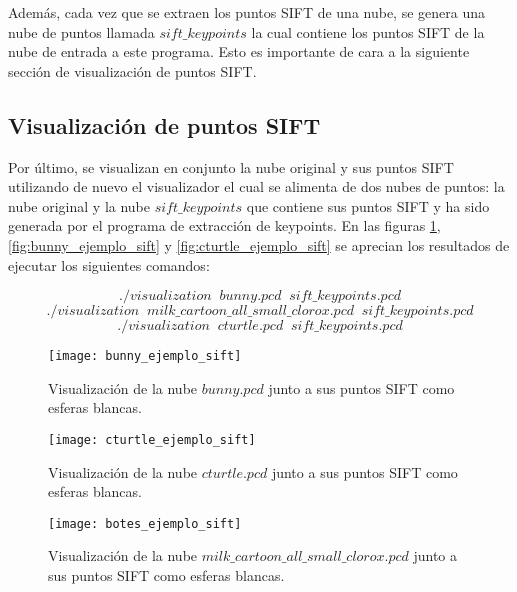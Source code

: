 Además, cada vez que se extraen los puntos SIFT de una nube, se genera una nube de puntos llamada $sift\_keypoints$ la cual contiene los puntos SIFT de la nube de entrada a este programa. Esto es importante de cara a la siguiente sección de visualización de puntos SIFT.


\subsection{Visualización de puntos SIFT}
Por último, se visualizan en conjunto la nube original y sus puntos SIFT utilizando de nuevo el visualizador el cual se alimenta de dos nubes de puntos: la nube original y la nube $sift\_keypoints$ que contiene sus puntos SIFT y ha sido generada por el programa de extracción de keypoints. En las figuras \ref{fig:botes_ejemplo_sift}, \ref{fig:bunny_ejemplo_sift} y \ref{fig:cturtle_ejemplo_sift} se aprecian los resultados de ejecutar los siguientes comandos:

$$./visualization\;\;bunny.pcd\;\;sift\_keypoints.pcd$$
$$./visualization\;\;milk\_cartoon\_all\_small\_clorox.pcd\;\;sift\_keypoints.pcd$$
$$./visualization\;\;cturtle.pcd\;\;sift\_keypoints.pcd$$


\begin{figure}[!htb]
  \texttt{[image: bunny\_ejemplo\_sift]}
  \caption{Visualización de la nube $bunny.pcd$ junto a sus puntos SIFT como esferas blancas.}\label{fig:bunny_ejemplo_sift}
\endminipage\hfill
{}
  \texttt{[image: cturtle\_ejemplo\_sift]}
  \caption{Visualización de la nube $cturtle.pcd$ junto a sus puntos SIFT como esferas blancas.}\label{fig:cturtle_ejemplo_sift}
\endminipage\hfill
{}
  \texttt{[image: botes\_ejemplo\_sift]}
  \caption{Visualización de la nube $milk\_cartoon\_all\_small\_clorox.pcd$ junto a sus puntos SIFT como esferas blancas.}\label{fig:botes_ejemplo_sift}
\endminipage\hfill
\end{figure}

